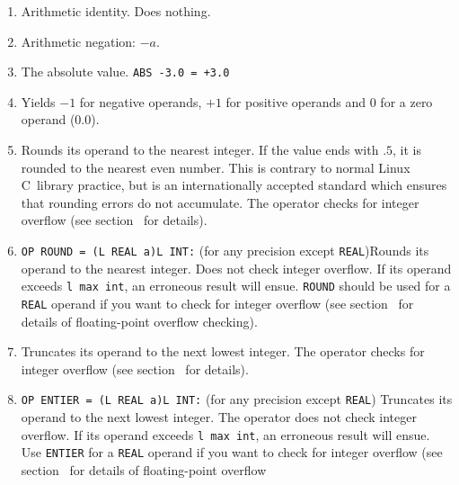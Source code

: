 \begin{enumerate}
\item {}\newline
Arithmetic identity. Does nothing.
\item {}\newline
Arithmetic negation: $-a$.
\item {}\newline
The absolute value. \verb|ABS -3.0 = +3.0|
\item {} \newline
Yields $-1$ for negative operands, $+1$ for positive op\-erands and $0$ for
a zero operand ($0.0$).
\item {} \newline
Rounds its operand to the nearest integer. If the value ends with $.5$,
it is rounded to the nearest even number. This is contrary to normal
Linux C~library practice, but is an internationally accepted standard
which ensures that rounding errors do not accumulate. The operator
checks for integer overflow (see section~ for details).
\item \verb|OP ROUND = (L REAL a)L INT:|
(for any precision except \verb|REAL|)\newline Rounds its operand to
the nearest integer. Does not check integer overflow. If its operand
exceeds \verb|l max int|, an erroneous result will ensue.
\verb|ROUND| should be used for a \verb|REAL| operand if you want to
check for integer overflow (see section~ for details
of floating-point overflow checking).
\item {}\newline
Truncates its operand to the next lowest integer. The operator checks
for integer overflow (see section~ for details).
\item \verb|OP ENTIER = (L REAL a)L INT:|
(for any precision except \verb|REAL|) \newline
Truncates its operand to the next lowest integer. The operator does not
check integer overflow. If its operand exceeds \verb|l max int|, an
erroneous result will ensue. Use \verb|ENTIER| for a \verb|REAL|
operand if you want to check for integer overflow (see
section~ for details of floating-point overflow

\end{enumerate}
